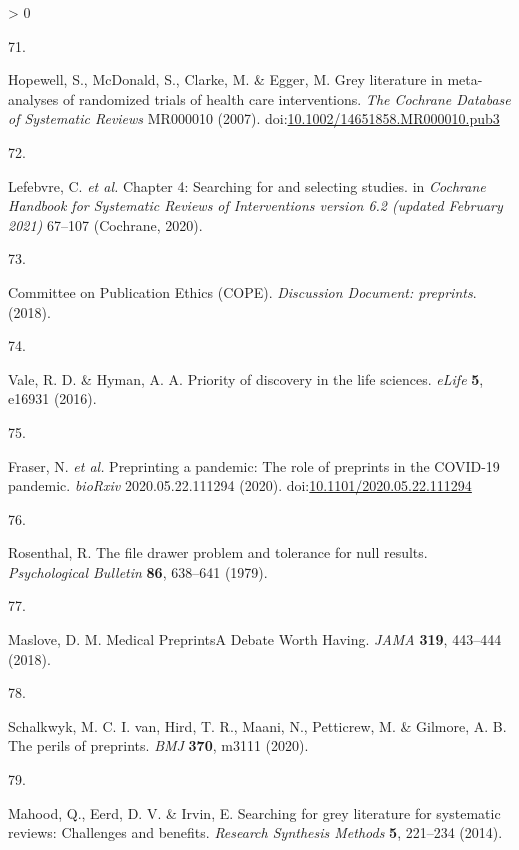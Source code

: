 \documentclass[a4paper, twoside]{templates/ociamthesis}
\newlength{\cslhangindent}
\newlength{\csllabelwidth}
\newenvironment{CSLReferences}[3] %
 {%
  \setlength{\parindent}{0pt}
  \ifodd #1 \everypar{\setlength{\hangindent}{\cslhangindent}}\ignorespaces\fi
  \ifnum #2 > 0
  \setlength{\parskip}{#2\baselineskip}
  \fi
 }%
 {}
\newcommand{\CSLLeftMargin}[1]{\parbox[t]{\maxof{\widthof{#1}}{\csllabelwidth}}{#1}}
\newcommand{\CSLRightInline}[1]{\parbox[t]{\linewidth - \csllabelwidth}{#1}}
\begin{document}
\begin{CSLReferences}{0}{0}
\leavevmode\hypertarget{ref-hopewell2007}{}%
\CSLLeftMargin{71. }
\CSLRightInline{Hopewell, S., McDonald, S., Clarke, M. \& Egger, M. Grey literature in meta-analyses of randomized trials of health care interventions. \emph{The Cochrane Database of Systematic Reviews} MR000010 (2007). doi:\href{https://doi.org/10.1002/14651858.MR000010.pub3}{10.1002/14651858.MR000010.pub3}}

\leavevmode\hypertarget{ref-lefebvre2019searching}{}%
\CSLLeftMargin{72. }
\CSLRightInline{Lefebvre, C. \emph{et al.} Chapter 4: Searching for and selecting studies. in \emph{Cochrane {Handbook} for {Systematic Reviews} of {Interventions} version 6.2 (updated {February} 2021)} 67--107 ({Cochrane}, 2020).}

\leavevmode\hypertarget{ref-committeeonpublicationethicscope2018}{}%
\CSLLeftMargin{73. }
\CSLRightInline{Committee on Publication Ethics (COPE). \emph{Discussion {Document}: preprints}. (2018).}

\leavevmode\hypertarget{ref-vale2016}{}%
\CSLLeftMargin{74. }
\CSLRightInline{Vale, R. D. \& Hyman, A. A. Priority of discovery in the life sciences. \emph{eLife} \textbf{5}, e16931 (2016).}

\leavevmode\hypertarget{ref-fraser2020preprinting}{}%
\CSLLeftMargin{75. }
\CSLRightInline{Fraser, N. \emph{et al.} Preprinting a pandemic: The role of preprints in the {COVID}-19 pandemic. \emph{bioRxiv} 2020.05.22.111294 (2020). doi:\href{https://doi.org/10.1101/2020.05.22.111294}{10.1101/2020.05.22.111294}}

\leavevmode\hypertarget{ref-rosenthal1979}{}%
\CSLLeftMargin{76. }
\CSLRightInline{Rosenthal, R. The file drawer problem and tolerance for null results. \emph{Psychological Bulletin} \textbf{86}, 638--641 (1979).}

\leavevmode\hypertarget{ref-maslove2018}{}%
\CSLLeftMargin{77. }
\CSLRightInline{Maslove, D. M. Medical {Preprints}{{A Debate Worth Having}}. \emph{JAMA} \textbf{319}, 443--444 (2018).}

\leavevmode\hypertarget{ref-schalkwyk2020}{}%
\CSLLeftMargin{78. }
\CSLRightInline{Schalkwyk, M. C. I. van, Hird, T. R., Maani, N., Petticrew, M. \& Gilmore, A. B. The perils of preprints. \emph{BMJ} \textbf{370}, m3111 (2020).}

\leavevmode\hypertarget{ref-mahood2014}{}%
\CSLLeftMargin{79. }
\CSLRightInline{Mahood, Q., Eerd, D. V. \& Irvin, E. Searching for grey literature for systematic reviews: Challenges and benefits. \emph{Research Synthesis Methods} \textbf{5}, 221--234 (2014).}


\end{CSLReferences}
\end{document}
